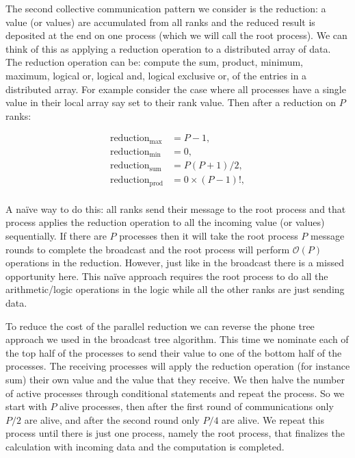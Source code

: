 The second collective communication pattern we consider is the reduction: a value (or values) are accumulated from all ranks and the reduced result is deposited at the end on one process (which we will call the root process). We can think of this as applying a reduction operation to a distributed array of data. The reduction operation can be: compute the sum, product, minimum, maximum, logical or, logical and, logical exclusive or, of the entries in a distributed array. For example consider the case where all processes have a single value in their local array say set to their rank value. Then after a reduction on $P$ ranks:

\begin{align*}
    \mbox{reduction}_{\mbox{max}} &= P-1, \\
    \mbox{reduction}_{\mbox{min}} &= 0, \\
    \mbox{reduction}_{\mbox{sum}} &= P(P+1)/2, \\
    \mbox{reduction}_{\mbox{prod}} &= 0\times (P-1)!, \\
\end{align*}

A na\"{i}ve way to do this: all ranks send their message to the root process and that process applies the reduction operation to all the incoming value (or values) sequentially. If there are $P$ processes then it will take the root process $P$ message rounds to complete the broadcast and the root process will perform $\mathcal{O}(P)$ operations in the reduction. However, just like in the broadcast there is a missed opportunity here. This na\"{i}ve approach requires the root process to do all the arithmetic/logic operations in the logic while all the other ranks are just sending data. 

To reduce the cost of the parallel reduction we can reverse the phone tree approach we used in the broadcast tree algorithm. This time we nominate each of the top half of the processes to send their value to one of the bottom half of the processes. The receiving processes will apply the reduction operation (for instance sum) their own value and the value that they receive. We then halve the number of active processes through conditional statements and repeat the process. So we start with $P$ alive processes, then after the first round of communications only $P/2$ are alive, and after the second round only $P/4$ are alive. We repeat this process until there is just one process, namely the root process, that finalizes the calculation with incoming data and the computation is completed. 

